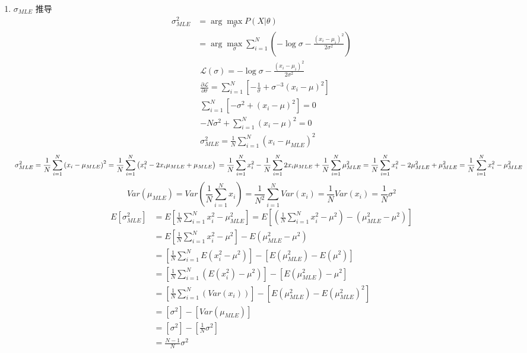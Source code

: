 \documentclass[11pt]{article}
\begin{document}
\begin{enumerate}
\item \(\sigma_{MLE}\) 推导
\label{sec:orga465625}
\begin{equation}
\begin{align}
\label{eq:2}
\sigma_{MLE}^2 &= \arg \max_{\sigma} P(X|\theta) \\
&= \arg\max_{\sigma} \sum\limits_{i=1}^N (- \log \sigma - \frac{\left( x_i-\mu_i \right)^2}{2\sigma^2})
\end{align}
\end{equation}
\begin{equation}
\begin{align}
\label{eq:8}
&\mathcal L(\sigma) =  - \log \sigma - \frac{\left( x_i-\mu_i \right)^2}{2\sigma^2} \\
&\frac{\partial \mathcal L}{\partial\sigma} = \sum\limits_{i=1}^N \left[ -\frac{1}{\sigma} + \sigma^{-3} \left( x_i -\mu \right)^{2}\right] \\
&\sum\limits_{i=1}^N \left[ -\sigma^2 + \left( x_i -\mu \right)^2  \right] = 0\\
& -N\sigma^2 + \sum\limits_{i=1}^N \left( x_i -\mu \right)^2 = 0 \\
& \sigma_{MLE}^2 = \frac{1}{N} \sum\limits_{i=1}^N \left( x_i - \mu_{MLE} \right)^{2}
\end{align}
\end{equation}
\[
\sigma_{MLE}^{2} = \frac{1}{N} \sum\limits_{i=1}^N \left( x_i - \mu_{MLE} \right)^{2} = \frac{1}{N} \sum\limits_{i=1}^N \left( x_i^2 - 2x_i \mu_{MLE} + \mu_{MLE}  \right)\\
= \frac{1}{N} \sum\limits_{i=1}^N x_i^2 - \frac{1}{N} \sum\limits_{i=1}^N 2 x_i \mu_{MLE} + \frac{1}{N} \sum\limits_{i=1}^N \mu_{MLE}^2  
= \frac{1}{N} \sum\limits_{i=1}^N x_i^2 - 2 \mu_{MLE}^2 + \mu_{MLE}^2 = \frac{1}{N} \sum\limits_{i=1}^N x_i^2 - \mu_{MLE}^{2} 
\]
\[
Var(\mu_{MLE}) = Var(\frac{1}{N}\sum\limits_{i=1}^N x_i) = \frac{1}{N^2} \sum\limits_{i=1}^N Var(x_i) = \frac{1}{N} Var(x_i) = \frac{1}{N} \sigma^2
\]
\begin{equation}
\begin{align}
\label{eq:9}
E[\sigma_{MLE}^2] &= E[\frac{1}{N} \sum\limits_{i=1}^N x_i^2 - \mu_{MLE}^2] = E[(\frac{1}{N}\sum\limits_{i=1}^N x_i^2 - \mu^2) - \left( \mu_{MLE}^2 -\mu^2 \right)] \\
&= E[\frac{1}{N} \sum\limits_{i=1}^N x_i^2 -\mu^2] - E(\mu_{MLE}^2 - \mu^2)\\
&= [\frac{1}{N} \sum\limits_{i=1}^N E(x_i^2 - \mu^2)] - [E(\mu_{MLE}^2) - E(\mu^2)]\\
&= [\frac{1}{N} \sum\limits_{i=1}^N (E(x_i^2) - \mu^2)] - [E(\mu_{MLE}^2) - \mu^2] \\
&= [\frac{1}{N} \sum\limits_{i=1}^N (Var(x_i))] - [E(\mu_{MLE}^2) - E(\mu_{MLE}^2)^{2}]\\
&= [\sigma^{2}] - [Var(\mu_{MLE})]\\
&= [\sigma^2] - [\frac{1}{N} \sigma^2]\\
&= \frac{N-1}{N} \sigma^2
\end{align}
\end{equation}


\end{enumerate}
\end{document}
